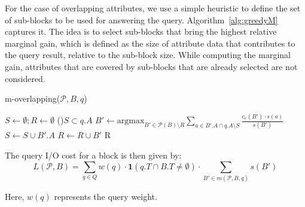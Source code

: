 For the case of overlapping attributes, we use a simple heuristic to define the
set of sub-blocks to be used for answering the query.
Algorithm~\ref{alg:greedyM} captures it. The idea is to select sub-blocks that
bring the highest relative marginal gain, which is defined as the size of
attribute data that contributes to the query result, relative to the sub-block
size. While computing the marginal gain, attributes that are covered by
sub-blocks that are already selected are not considered.
%
\begin{algorithm}[ht]
\scriptsize
\caption{m-overlapping($\mathcal{P}, B, q$)}
\label{alg:greedyM}
$S\leftarrow \emptyset; R\leftarrow \emptyset$ 
\While(){$S \subset q.A$}{
  $B' \leftarrow \mbox{argmax}_{B'\in\mathcal{P}(B)\setminus R} \sum_{a\in B'.A \cap q.A \setminus S} \frac{c_e(B') \cdot s(a)}{s(B')}$
  $S \leftarrow S \cup B'.A$
  $R\leftarrow R \cup B'$
}
\Return R 
\end{algorithm} 
%
The query I/O cost for a block is then given by:
\begin{equation}
L(\mathcal{P}, B) = \sum_{q\in Q} w(q)\cdot\mathbf{1}(q.T \cap B.T \neq \emptyset) \cdot \sum_{B'\in m(\mathcal{P}, B, q)} \!\!s(B')
\end{equation}

Here, $w(q)$ represents the query weight.



